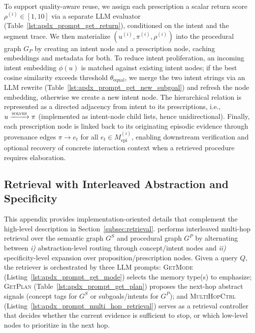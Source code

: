 {To support quality-aware reuse, we assign each prescription a scalar return score $\rho^{(i)}\in[1,10]$ via a separate LLM evaluator (Table~\ref{lst:apdx_prompt_get_return}), conditioned on the intent and the segment trace. We then materialize $(u^{(i)}, \pi^{(i)}, \rho^{(i)})$ into the procedural graph $G_P$ by creating an intent node and a prescription node, caching embeddings and metadata for both. To reduce intent proliferation, an incoming intent embedding $\phi(u)$ is matched against existing intent nodes; if the best cosine similarity exceeds threshold $\theta_{\mathrm{equal}}$, we merge the two intent strings via an LLM rewrite (Table~\ref{lst:apdx_prompt_get_new_subgoal}) and refresh the node embedding, otherwise we create a new intent node. The hierarchical relation is represented as a directed adjacency from intent to its prescriptions, i.e., $u \xrightarrow{\textsc{solves}} \pi$ (implemented as intent-node child lists, hence unidirectional). Finally, each prescription node is linked back to its originating episodic evidence through provenance edges $\pi \rightarrow e_t$ for all $e_t \in M^{(i)}_{\mathrm{epi}}$, enabling downstream verification and optional recovery of concrete interaction context when a retrieved procedure requires elaboration.






\subsection{Retrieval with Interleaved Abstraction and Specificity}
\label{app:implementation_retrieval}


This appendix provides implementation-oriented details that complement the high-level description in Section~\ref{subsec:retrieval}.
\plugmem performs interleaved multi-hop retrieval over the semantic graph $G^{S}$ and procedural graph $G^{P}$ by alternating between \textit{i)} abstraction-level routing through concept/intent nodes and \textit{ii)} specificity-level expansion over proposition/prescription nodes.
Given a query $Q$, the retriever is orchestrated by three LLM prompts: \textsc{GetMode} (Listing~\ref{lst:apdx_prompt_get_mode}) selects the memory type(s) to emphasize; \textsc{GetPlan} (Table~\ref{lst:apdx_prompt_get_plan}) proposes the next-hop abstract signals (concept tags for $G^{S}$ or subgoals/intents for $G^{P}$); and \textsc{MultiHopCtrl} (Listing~\ref{lst:apdx_prompt_multi_hop_retrieval}) serves as a retrieval controller that decides whether the current evidence is sufficient to stop, or which low-level nodes to prioritize in the next hop.



}
